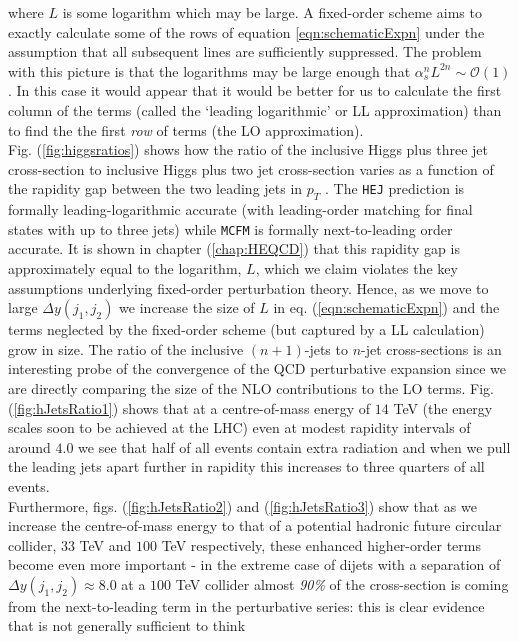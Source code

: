 		where $L$ is some logarithm which may be large.  A fixed-order scheme aims to exactly calculate some of the rows of equation
		\eqref{eqn:schematicExpn} under the assumption that all subsequent lines are sufficiently suppressed.  The problem with this
		picture is that the logarithms may be large enough that $\alpha_s^nL^{2n}\sim\mathcal{O}(1)$.  In this case it would appear
		that it would be better for us to calculate the first column of the terms (called the `leading logarithmic' or LL
		approximation) than to find the the first \emph{row} of terms (the LO approximation).\\Fig. (\ref{fig:higgsratios}) shows how
		the ratio of the inclusive Higgs plus three jet cross-section to inclusive Higgs plus two jet cross-section varies as
		a function of the rapidity gap between the two leading jets in $p_T$ \cite{jeppeTalk}.  The \texttt{HEJ} prediction is formally leading-logarithmic
		accurate (with leading-order matching for final states with up to three jets) while \texttt{MCFM} is formally next-to-leading order
		accurate.  It is shown in chapter (\ref{chap:HEQCD}) that this rapidity gap is approximately equal to the logarithm, $L$, which
		we claim violates the key assumptions underlying fixed-order perturbation theory.  Hence, as we move to large $\Delta y(j_1, j_2)$
		we increase the size of $L$ in eq. (\ref{eqn:schematicExpn}) and the terms neglected by the fixed-order scheme (but captured by a
		LL calculation) grow in size.  The ratio of the inclusive $(n+1)$-jets to $n$-jet cross-sections is an interesting probe of the
		convergence of the QCD perturbative expansion since we are directly comparing the size of the NLO contributions to the LO terms.
		Fig. (\ref{fig:hJetsRatio1}) shows that at a centre-of-mass energy of $14$ TeV (the energy scales soon to be achieved at the LHC)
		even at modest rapidity intervals of around $4.0$ we see that half of all events contain extra radiation and when we pull the leading
		jets apart further in rapidity this increases to three quarters of all events.\\ Furthermore, figs. (\ref{fig:hJetsRatio2}) and
		(\ref{fig:hJetsRatio3}) show that as we increase the centre-of-mass energy to that of a potential hadronic future circular
		collider, $33$ TeV and $100$ TeV respectively, these enhanced higher-order terms become even more important - in the extreme case
		of dijets with a separation of $\Delta y(j_1, j_2)\approx8.0$ at a $100$ TeV collider almost \emph{90\%} of the cross-section is
		coming from the next-to-leading term in the perturbative series: this is clear evidence that is not generally sufficient to think
